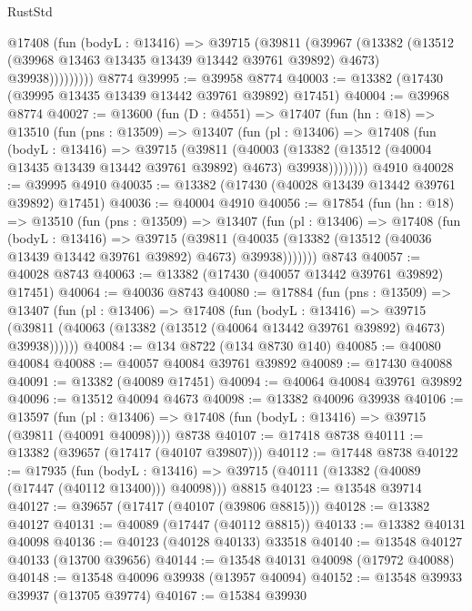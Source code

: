 \begin{lexlean}{RustStd}
\begin{coremodule}
            @17408
              (fun (bodyL : @13416) =>
              @39715
                (@39811
                  (@39967
                    (@13382
                      (@13512 (@39968 @13463 @13435 @13439 @13442 @39761 @39892) @4673)
                      @39938)))))))))
    @8774
@39995 := @39958 @8774
@40003 := @13382 (@17430 (@39995 @13435 @13439 @13442 @39761 @39892) @17451)
@40004 := @39968 @8774
@40027 := @13600
    (fun (D : @4551) =>
    @17407
      (fun (hn : @18) =>
      @13510
        (fun (pns : @13509) =>
        @13407
          (fun (pl : @13406) =>
          @17408
            (fun (bodyL : @13416) =>
            @39715
              (@39811
                (@40003
                  (@13382 (@13512 (@40004 @13435 @13439 @13442 @39761 @39892) @4673) @39938))))))))
    @4910
@40028 := @39995 @4910
@40035 := @13382 (@17430 (@40028 @13439 @13442 @39761 @39892) @17451)
@40036 := @40004 @4910
@40056 := @17854
    (fun (hn : @18) =>
    @13510
      (fun (pns : @13509) =>
      @13407
        (fun (pl : @13406) =>
        @17408
          (fun (bodyL : @13416) =>
          @39715
            (@39811
              (@40035 (@13382 (@13512 (@40036 @13439 @13442 @39761 @39892) @4673) @39938)))))))
    @8743
@40057 := @40028 @8743
@40063 := @13382 (@17430 (@40057 @13442 @39761 @39892) @17451)
@40064 := @40036 @8743
@40080 := @17884
    (fun (pns : @13509) =>
    @13407
      (fun (pl : @13406) =>
      @17408
        (fun (bodyL : @13416) =>
        @39715 (@39811 (@40063 (@13382 (@13512 (@40064 @13442 @39761 @39892) @4673) @39938))))))
@40084 := @134 @8722 (@134 @8730 @140)
@40085 := @40080 @40084
@40088 := @40057 @40084 @39761 @39892
@40089 := @17430 @40088
@40091 := @13382 (@40089 @17451)
@40094 := @40064 @40084 @39761 @39892
@40096 := @13512 @40094 @4673
@40098 := @13382 @40096 @39938
@40106 := @13597
    (fun (pl : @13406) => @17408 (fun (bodyL : @13416) => @39715 (@39811 (@40091 @40098))))
    @8738
@40107 := @17418 @8738
@40111 := @13382 (@39657 (@17417 (@40107 @39807)))
@40112 := @17448 @8738
@40122 := @17935
    (fun (bodyL : @13416) => @39715 (@40111 (@13382 (@40089 (@17447 (@40112 @13400))) @40098)))
    @8815
@40123 := @13548 @39714
@40127 := @39657 (@17417 (@40107 (@39806 @8815)))
@40128 := @13382 @40127
@40131 := @40089 (@17447 (@40112 @8815))
@40133 := @13382 @40131 @40098
@40136 := @40123 (@40128 @40133) @33518
@40140 := @13548 @40127 @40133 (@13700 @39656)
@40144 := @13548 @40131 @40098 (@17972 @40088)
@40148 := @13548 @40096 @39938 (@13957 @40094)
@40152 := @13548 @39933 @39937 (@13705 @39774)
@40167 := @15384
    @39930

\end{coremodule}
\end{lexlean}
